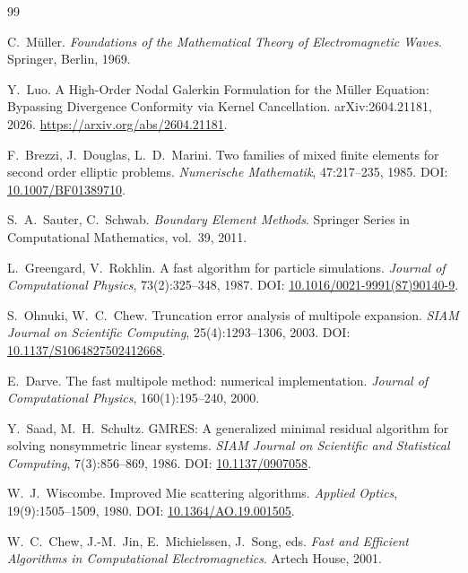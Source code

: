 \documentclass[12pt,a4paper]{article}
\begin{document}
\begin{thebibliography}{99}

C.~Müller.
\newblock \emph{Foundations of the Mathematical Theory of Electromagnetic Waves}.
\newblock Springer, Berlin, 1969.

Y.~Luo.
\newblock A High-Order Nodal Galerkin Formulation for the Müller Equation:
Bypassing Divergence Conformity via Kernel Cancellation.
\newblock arXiv:2604.21181, 2026.
\newblock \url{https://arxiv.org/abs/2604.21181}.

F.~Brezzi, J.~Douglas, L.~D.~Marini.
\newblock Two families of mixed finite elements for second order elliptic
problems.
\newblock \emph{Numerische Mathematik}, 47:217--235, 1985.
\newblock DOI: \href{https://doi.org/10.1007/BF01389710}{10.1007/BF01389710}.

S.~A.~Sauter, C.~Schwab.
\newblock \emph{Boundary Element Methods}.
\newblock Springer Series in Computational Mathematics, vol.~39, 2011.

L.~Greengard, V.~Rokhlin.
\newblock A fast algorithm for particle simulations.
\newblock \emph{Journal of Computational Physics}, 73(2):325--348, 1987.
\newblock DOI: \href{https://doi.org/10.1016/0021-9991(87)90140-9}{10.1016/0021-9991(87)90140-9}.

S.~Ohnuki, W.~C.~Chew.
\newblock Truncation error analysis of multipole expansion.
\newblock \emph{SIAM Journal on Scientific Computing}, 25(4):1293--1306, 2003.
\newblock DOI: \href{https://doi.org/10.1137/S1064827502412668}{10.1137/S1064827502412668}.

E.~Darve.
\newblock The fast multipole method: numerical implementation.
\newblock \emph{Journal of Computational Physics}, 160(1):195--240, 2000.

Y.~Saad, M.~H.~Schultz.
\newblock GMRES: A generalized minimal residual algorithm for solving
nonsymmetric linear systems.
\newblock \emph{SIAM Journal on Scientific and Statistical Computing},
7(3):856--869, 1986.
\newblock DOI: \href{https://doi.org/10.1137/0907058}{10.1137/0907058}.

W.~J.~Wiscombe.
\newblock Improved Mie scattering algorithms.
\newblock \emph{Applied Optics}, 19(9):1505--1509, 1980.
\newblock DOI: \href{https://doi.org/10.1364/AO.19.001505}{10.1364/AO.19.001505}.

W.~C.~Chew, J.-M.~Jin, E.~Michielssen, J.~Song, eds.
\newblock \emph{Fast and Efficient Algorithms in Computational Electromagnetics}.
\newblock Artech House, 2001.

\end{thebibliography}
\end{document}
